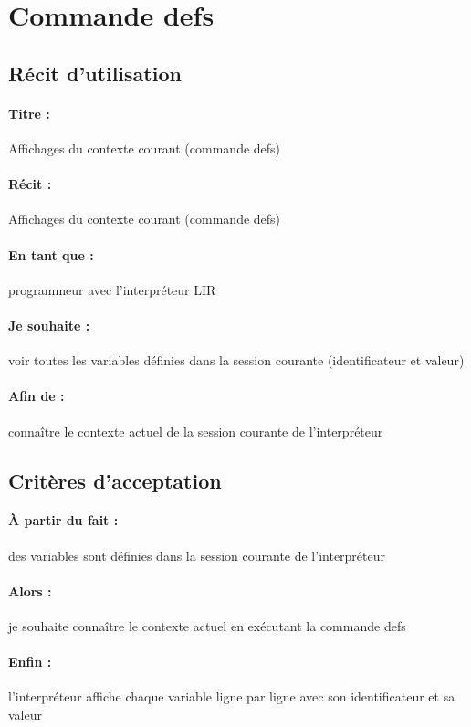     \section{Commande defs}
    \subsection*{Récit d'utilisation}

    \paragraph{Titre : } Affichages du contexte courant (commande defs)
    \paragraph{Récit : } Affichages du contexte courant (commande defs)
    \paragraph{En tant que : } programmeur avec l'interpréteur LIR
    \paragraph{Je souhaite : } voir toutes les variables définies dans la session courante (identificateur et valeur)
    \paragraph{Afin de : } connaître le contexte actuel de la session courante de l'interpréteur

    \subsection*{Critères d'acceptation}

    \paragraph{À partir du fait : } des variables sont définies dans la session courante de l'interpréteur
    \paragraph{Alors : } je souhaite connaître le contexte actuel en exécutant la commande defs
    \paragraph{Enfin : } l'interpréteur affiche chaque variable ligne par ligne avec son identificateur et sa valeur
